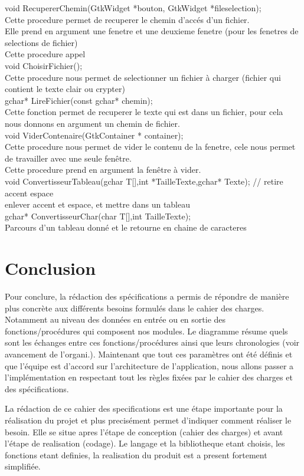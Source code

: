 \documentclass[a4]{article}
\begin{document}
	void RecupererChemin(GtkWidget *bouton, GtkWidget *fileselection);\\
		Cette procedure permet de recuperer le chemin d'accés d'un fichier.\\
		Elle prend en argument une fenetre et une deuxieme fenetre (pour les fenetres de selections de fichier)\\
		Cette procedure appel\\

	void ChoisirFichier();\\
		Cette procedure nous permet de selectionner un fichier à charger (fichier qui contient le texte clair ou 		crypter)\\

		
	gchar* LireFichier(const gchar* chemin);\\
		Cette fonction permet de recuperer le texte qui est dans un fichier, pour cela nous donnons en argument un chemin de fichier.\\
		
	void ViderContenaire(GtkContainer * container);\\
		Cette procedure nous permet de vider le contenu de la fenetre, cele nous permet de travailler avec une seule fenêtre.\\
		Cette procedure prend en argument la fenêtre à vider.\\
	void ConvertisseurTableau(gchar T[],int *TailleTexte,gchar* Texte); // retire accent espace\\
		enlever accent et espace, et mettre dans un tableau\\
	 
	gchar* ConvertisseurChar(char T[],int TailleTexte); \\
		Parcours d'un tableau donné et le retourne en chaine de caracteres\\
		
	
	\section{Conclusion}
	
	Pour conclure, la rédaction des spécifications a permis de répondre de manière plus concrète aux différents besoins
	formulés dans le cahier des charges. Notamment au niveau des données en entrée ou en sortie des fonctions/procédures
	qui composent nos modules. Le diagramme résume quels sont les échanges entre ces fonctions/procédures ainsi que
	leurs chronologies (voir avancement de l'organi.).
	Maintenant que tout ces paramètres ont été définis et que l'équipe est d'accord sur l'architecture de l'application, nous allons
	passer a l'implémentation en respectant tout les règles fixées par le cahier des charges et des spécifications.
	
	La rédaction de ce cahier des specifications est une étape importante pour la réalisation du projet
	et plus precisément permet d'indiquer comment réaliser le besoin.
	Elle se situe apres l'étape de conception
	(cahier des charges) et avant l'étape de realisation (codage). Le langage et la bibliotheque etant choisis,
	les fonctions etant definies, la realisation du produit est a present fortement simplifiée. 
	
	
\end{document}
